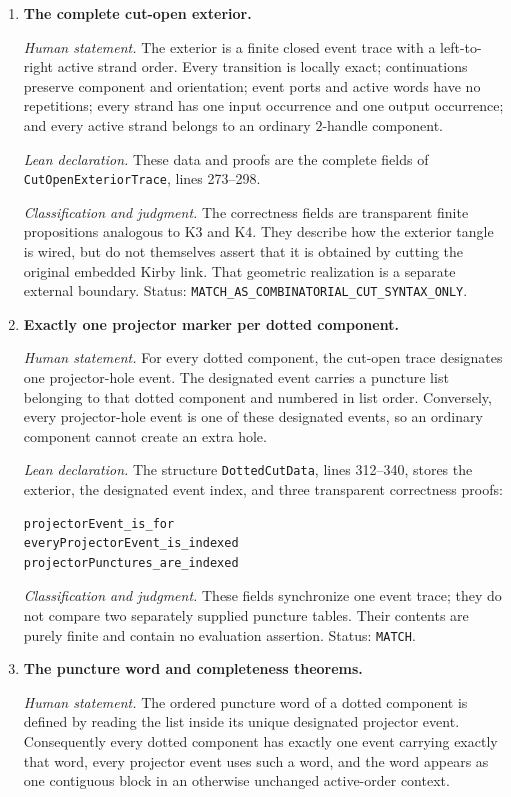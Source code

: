\begin{enumerate}[label=\textbf{C\arabic*.},leftmargin=*]
\item \textbf{The complete cut-open exterior.}

\emph{Human statement.}
The exterior is a finite closed event trace with a left-to-right active strand
order.  Every transition is locally exact; continuations preserve component
and orientation; event ports and active words have no repetitions; every
strand has one input occurrence and one output occurrence; and every active
strand belongs to an ordinary $2$-handle component.

\emph{Lean declaration.}
These data and proofs are the complete fields of
\texttt{CutOpenExteriorTrace}, lines 273--298.

\emph{Classification and judgment.}
The correctness fields are transparent finite propositions analogous to K3
and K4.  They describe how the exterior tangle is wired, but do not themselves
assert that it is obtained by cutting the original embedded Kirby link.
That geometric realization is a separate external boundary.  Status:
\nolinkurl{MATCH_AS_COMBINATORIAL_CUT_SYNTAX_ONLY}.

\item \textbf{Exactly one projector marker per dotted component.}

\emph{Human statement.}
For every dotted component, the cut-open trace designates one projector-hole
event.  The designated event carries a puncture list belonging to that dotted
component and numbered in list order.  Conversely, every projector-hole event
is one of these designated events, so an ordinary component cannot create an
extra hole.

\emph{Lean declaration.}
The structure \texttt{DottedCutData}, lines 312--340, stores the exterior,
the designated event index, and three transparent correctness proofs:
\begin{verbatim}
projectorEvent_is_for
everyProjectorEvent_is_indexed
projectorPunctures_are_indexed
\end{verbatim}

\emph{Classification and judgment.}
These fields synchronize one event trace; they do not compare two separately
supplied puncture tables.  Their contents are purely finite and contain no
evaluation assertion.  Status: \texttt{MATCH}.

\item \textbf{The puncture word and completeness theorems.}

\emph{Human statement.}
The ordered puncture word of a dotted component is defined by reading the list
inside its unique designated projector event.  Consequently every dotted
component has exactly one event carrying exactly that word, every projector
event uses such a word, and the word appears as one contiguous block in an
otherwise unchanged active-order context.


\end{enumerate}

